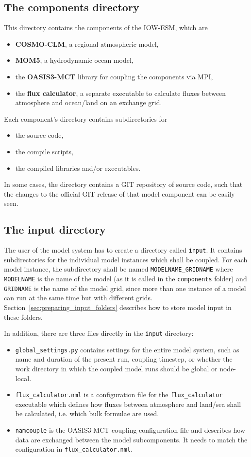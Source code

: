 \documentclass[a4paper,titlepage]{scrartcl}
\begin{document}
\subsection{The components directory}
This directory contains the components of the IOW-ESM, which are
\begin{itemize}
\item \textbf{COSMO-CLM}, a regional atmospheric model,
\item \textbf{MOM5}, a hydrodynamic ocean model,
\item the \textbf{OASIS3-MCT} library for coupling the components via MPI,
\item the \textbf{flux calculator}, a separate executable to calculate fluxes between atmosphere and ocean/land on an exchange grid.
\end{itemize}

Each component's directory contains subdirectories for
\begin{itemize}
\item the source code,
\item the compile scripts,
\item the compiled libraries and/or executables.
\end{itemize}
In some cases, the directory contains a GIT repository of source code, such that the changes to the official GIT release of that model component can be easily seen.

\subsection{The input directory}
The user of the model system has to create a directory called \texttt{input}.
It contains subdirectories for the individual model instances which shall be coupled.
For each model instance, the subdirectory shall be named \texttt{\color{red}MODELNAME\color{black}\_\color{red}GRIDNAME} where \texttt{\color{red}MODELNAME} is the name of the model (as it is called in the \texttt{components} folder) and \texttt{\color{red}GRIDNAME} is the name of the model grid, since more than one instance of a model can run at the same time but with different grids.
Section~\ref{sec:preparing_input_folders} describes how to store model input in these folders.

In addition, there are three files directly in the \texttt{input} directory:
\begin{itemize}
\item \texttt{global\_settings.py} contains settings for the entire model system, such as name and duration of the present run, coupling timestep, or whether the work directory in which the coupled model runs should be global or node-local.
\item \texttt{flux\_calculator.nml} is a configuration file for the \texttt{flux\_calculator} executable which defines how fluxes between atmosphere and land/sea shall be calculated, i.e. which bulk formulae are used.
\item \texttt{namcouple} is the OASIS3-MCT coupling configuration file and describes how data are exchanged between the model subcomponents. It needs to match the configuration in \texttt{flux\_calculator.nml}.
\end{itemize}
\end{document}
